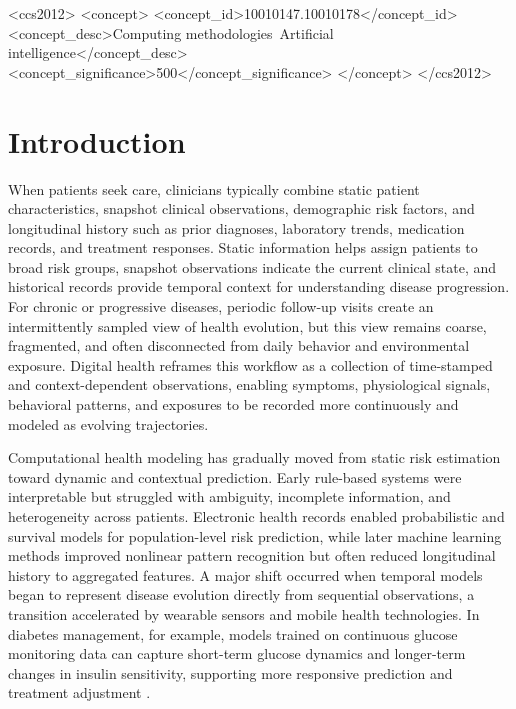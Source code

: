 \documentclass[acmsmall]{acmart}
\begin{document}
\begin{CCSXML}
<ccs2012>
<concept>
<concept_id>10010147.10010178</concept_id>
<concept_desc>Computing methodologies~Artificial intelligence</concept_desc>
<concept_significance>500</concept_significance>
</concept>
</ccs2012>
\end{CCSXML}


\maketitle




\section{Introduction}
When patients seek care, clinicians typically combine static patient characteristics, snapshot clinical observations, demographic risk factors, and longitudinal history such as prior diagnoses, laboratory trends, medication records, and treatment responses. Static information helps assign patients to broad risk groups, snapshot observations indicate the current clinical state, and historical records provide temporal context for understanding disease progression. For chronic or progressive diseases, periodic follow-up visits create an intermittently sampled view of health evolution, but this view remains coarse, fragmented, and often disconnected from daily behavior and environmental exposure. Digital health reframes this workflow as a collection of time-stamped and context-dependent observations, enabling symptoms, physiological signals, behavioral patterns, and exposures to be recorded more continuously and modeled as evolving trajectories.

Computational health modeling has gradually moved from static risk estimation toward dynamic and contextual prediction. Early rule-based systems were interpretable but struggled with ambiguity, incomplete information, and heterogeneity across patients. Electronic health records enabled probabilistic and survival models for population-level risk prediction, while later machine learning methods improved nonlinear pattern recognition but often reduced longitudinal history to aggregated features. A major shift occurred when temporal models began to represent disease evolution directly from sequential observations, a transition accelerated by wearable sensors and mobile health technologies. In diabetes management, for example, models trained on continuous glucose monitoring data can capture short-term glucose dynamics and longer-term changes in insulin sensitivity, supporting more responsive prediction and treatment adjustment \cite{Vaughan2025CGMPrediction,Gecili2020CGMPrediction}.
\end{document}
